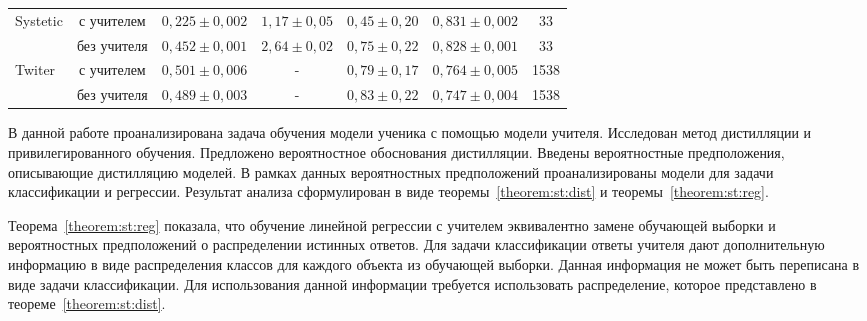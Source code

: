 \documentclass[12pt]{a&t}
\begin{document}
\begin{table}[]
\begin{center}
{\begin{tabular}{|l|c|c|c|c|c|c|}
\multirow{2}{*}{Systetic}     & с учителем  & $0{,}225\pm0{,}002$                                                & $1{,}17\pm0{,}05$                                                                             & $0{,}45\pm0{,}20$                                               & $0{,}831\pm0{,}002$ & 33                                                         \\ \cline{2-7} 
                              & без учителя & $0{,}452\pm0{,}001$                                                & $2{,}64\pm0{,}02$                                                                             & $0{,}75\pm0{,}22$                                               & $0{,}828\pm0{,}001$ & 33                                                         \\ \hline
\multirow{2}{*}{Twiter}       & с учителем  & $0{,}501\pm0{,}006$                                                & -                                                                                             & $0{,}79\pm0{,}17$                                               & $0{,}764\pm0{,}005$ & 1538                                                       \\ \cline{2-7} 
                              & без учителя & $0{,}489\pm0{,}003$                                                & -                                                                                             & $0{,}83\pm0{,}22$                                               & $0{,}747\pm0{,}004$ & 1538                                                       \\ \hline
\end{tabular}
}
\end{center}
\end{table}



В данной работе проанализирована задача обучения модели ученика с помощью модели учителя.
Исследован метод дистилляции и привилегированного обучения.
Предложено вероятностное обоснования дистилляции.
Введены вероятностные предположения, описывающие дистилляцию моделей.
В рамках данных вероятностных предположений проанализированы модели для задачи классификации и регрессии. Результат анализа сформулирован в виде теоремы~\ref{theorem:st:dist} и теоремы~\ref{theorem:st:reg}.

Теорема~\ref{theorem:st:reg} показала, что обучение линейной регрессии с учителем эквивалентно замене обучающей выборки и вероятностных предположений о распределении истинных ответов. Для задачи классификации ответы учителя дают дополнительную информацию в виде распределения классов для каждого объекта из обучающей выборки. Данная информация не может быть переписана в виде задачи классификации. Для использования данной информации требуется использовать распределение, которое представлено в теореме~\ref{theorem:st:dist}.
\end{document}
